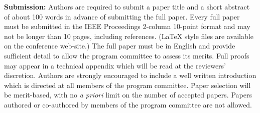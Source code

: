 \documentclass[oneside]{article}
\begin{document}
{\begin{minipage}[t]{\rightcol}
  \noindent%
  \textbf{Submission:} %
  Authors are required to submit a paper title and a short abstract of about 100
  words in advance of submitting the full paper.
  Every full paper must be submitted in the {IEEE} Proceedings 2-column
  10-point format and may not be longer than 10 pages, including references.
  ({\LaTeX} style files are available on the conference web-site.)
  The full paper must be in English and provide sufficient detail to
  allow the program committee to assess its merits.
%
  Full proofs may appear in a technical appendix which will be read at the
  reviewers' discretion.
%
  Authors are strongly encouraged to include a well written introduction which
  is directed at all members of the program committee.
%
  Paper selection will be merit-based, with no \emph{a priori} limit on the number
  of accepted papers.
%
   Papers authored or co-authored by members of the program committee are not
   allowed.

   \medskip


\end{minipage}}
\end{document}

